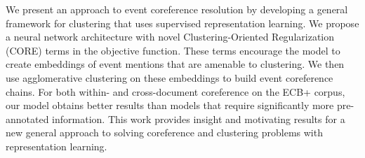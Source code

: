 We present an approach to event coreference resolution by developing a general framework for clustering that uses supervised representation learning. We propose a neural network architecture with novel Clustering-Oriented Regularization (CORE) terms in the objective function. These terms encourage the model to create embeddings of event mentions that are amenable to clustering. We then use agglomerative clustering on these embeddings to build event coreference chains. For both within- and cross-document coreference on the ECB+ corpus, our model obtains better results than models that require significantly more pre-annotated information. This work provides insight and motivating results for a new general approach to solving coreference and clustering problems with representation learning.
